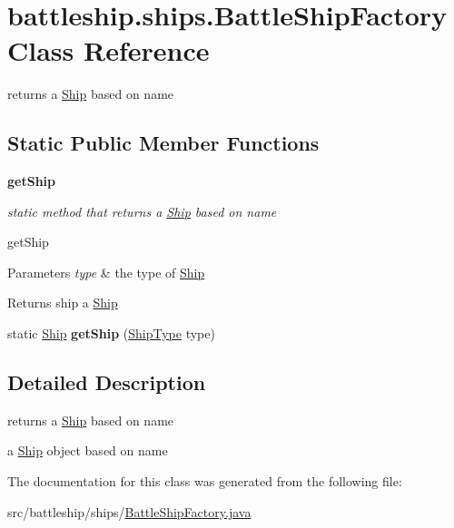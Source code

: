 \hypertarget{classbattleship_1_1ships_1_1BattleShipFactory}{}\section{battleship.\+ships.\+Battle\+Ship\+Factory Class Reference}
\label{classbattleship_1_1ships_1_1BattleShipFactory}


returns a \hyperlink{classbattleship_1_1ships_1_1Ship}{Ship} based on name  


\subsection*{Static Public Member Functions}
\begin{Indent}{\bf get\+Ship}\par
{\em static method that returns a \hyperlink{classbattleship_1_1ships_1_1Ship}{Ship} based on name

get\+Ship


\begin{DoxyParams}{Parameters}
{\em type} & the type of \hyperlink{classbattleship_1_1ships_1_1Ship}{Ship} \\
\hline
\end{DoxyParams}
\begin{DoxyReturn}{Returns}
ship a \hyperlink{classbattleship_1_1ships_1_1Ship}{Ship} 
\end{DoxyReturn}
}\begin{DoxyCompactItemize}
\item 
\hypertarget{classbattleship_1_1ships_1_1BattleShipFactory_a9e6ae5b9bfbd870906d768e4c2f232bf}{}static \hyperlink{classbattleship_1_1ships_1_1Ship}{Ship} {\bfseries get\+Ship} (\hyperlink{enumbattleship_1_1ships_1_1ShipType}{Ship\+Type} type)\label{classbattleship_1_1ships_1_1BattleShipFactory_a9e6ae5b9bfbd870906d768e4c2f232bf}

\end{DoxyCompactItemize}
\end{Indent}


\subsection{Detailed Description}
returns a \hyperlink{classbattleship_1_1ships_1_1Ship}{Ship} based on name 

a \hyperlink{classbattleship_1_1ships_1_1Ship}{Ship} object based on name 

The documentation for this class was generated from the following file\+:\begin{DoxyCompactItemize}
\item 
src/battleship/ships/\hyperlink{BattleShipFactory_8java}{Battle\+Ship\+Factory.\+java}\end{DoxyCompactItemize}
